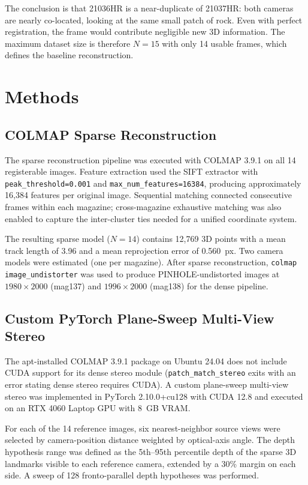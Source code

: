 \documentclass[12pt]{article}
\begin{document}
The conclusion is that 21036HR is a near-duplicate of 21037HR: both cameras are nearly co-located, looking at the same small patch of rock. Even with perfect registration, the frame would contribute negligible new 3D information. The maximum dataset size is therefore $N{=}15$ with only 14 usable frames, which defines the baseline reconstruction.

\section{Methods}
\label{sec:methods}

\subsection{COLMAP Sparse Reconstruction}

The sparse reconstruction pipeline was executed with COLMAP 3.9.1 on all 14 registerable images. Feature extraction used the SIFT extractor with \texttt{peak\_threshold=0.001} and \texttt{max\_num\_features=16384}, producing approximately 16,384 features per original image. Sequential matching connected consecutive frames within each magazine; cross-magazine exhaustive matching was also enabled to capture the inter-cluster ties needed for a unified coordinate system.

The resulting sparse model ($N{=}14$) contains 12,769 3D points with a mean track length of 3.96 and a mean reprojection error of 0.560~px. Two camera models were estimated (one per magazine). After sparse reconstruction, \texttt{colmap image\_undistorter} was used to produce PINHOLE-undistorted images at $1980 \times 2000$ (mag137) and $1996 \times 2000$ (mag138) for the dense pipeline.

\subsection{Custom PyTorch Plane-Sweep Multi-View Stereo}

The apt-installed COLMAP 3.9.1 package on Ubuntu 24.04 does not include CUDA support for its dense stereo module (\texttt{patch\_match\_stereo} exits with an error stating dense stereo requires CUDA). A custom plane-sweep multi-view stereo was implemented in PyTorch 2.10.0+cu128 with CUDA 12.8 and executed on an RTX 4060 Laptop GPU with 8~GB VRAM.

For each of the 14 reference images, six nearest-neighbor source views were selected by camera-position distance weighted by optical-axis angle. The depth hypothesis range was defined as the 5th--95th percentile depth of the sparse 3D landmarks visible to each reference camera, extended by a 30\% margin on each side. A sweep of 128 fronto-parallel depth hypotheses was performed.
\end{document}
